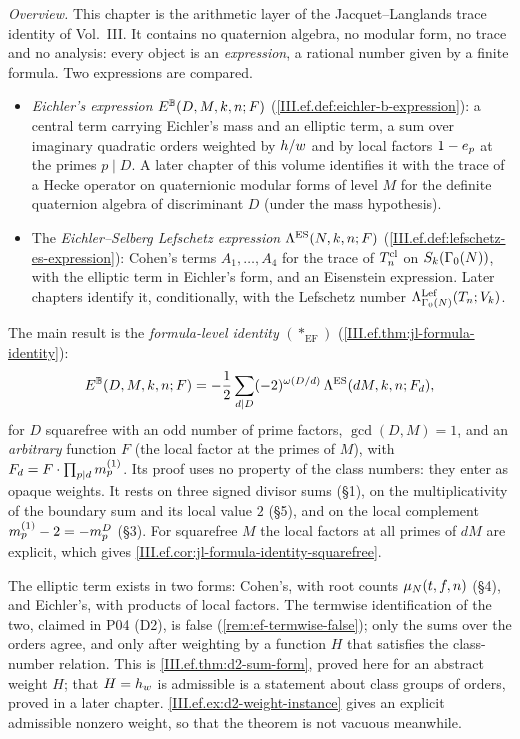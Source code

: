 \noindent\emph{Overview.} This chapter is the arithmetic layer of the Jacquet--Langlands trace identity of Vol.~III. It contains no quaternion
algebra, no modular form, no trace and no analysis: every object is an \emph{expression}, a rational number given by a finite formula. Two
expressions are compared.
\begin{itemize}
\item \emph{Eichler's expression} $E^{\mathbb{B}}(D,M,k,n;F)$ (\cref{III.ef.def:eichler-b-expression}): a central term carrying Eichler's mass and an elliptic
  term, a sum over imaginary quadratic orders weighted by $h/w$ and by local factors $1-e_p$ at the primes $p\mid D$. A later chapter of this
  volume identifies it with the trace of a Hecke operator on quaternionic modular forms of level $M$ for the definite quaternion algebra of
  discriminant $D$ (under the mass hypothesis).
\item The \emph{Eichler--Selberg Lefschetz expression} $\Lambda^{\mathrm{ES}}(N,k,n;F)$ (\cref{III.ef.def:lefschetz-es-expression}): Cohen's terms $A_1,\dots,A_4$
  for the trace of $T^{\mathrm{cl}}_n$ on $S_{k}(\Gamma_0(N))$, with the elliptic term in Eichler's form, and an Eisenstein expression. Later chapters identify it,
  conditionally, with the Lefschetz number $\Lambda^{\mathrm{Lef}}_{\Gamma_0(N)}(T_n;V_k)$.
\end{itemize}
The main result is the \emph{formula-level identity} $(*_{\mathrm{EF}})$ (\cref{III.ef.thm:jl-formula-identity}):
\[
  E^{\mathbb{B}}(D,M,k,n;F)=-\frac12\sum_{d\mid D}(-2)^{\omega(D/d)}\,\Lambda^{\mathrm{ES}}(dM,k,n;F_d),
\]
for $D$ squarefree with an odd number of prime factors, $\gcd(D,M)=1$, and an \emph{arbitrary} function $F$ (the local factor at the primes of $M$),
with $F_d=F\cdot\prod_{p\mid d}m^{(1)}_p$. Its proof uses no property of the class numbers: they enter as opaque weights. It rests on three
signed divisor sums (§1), on the multiplicativity of the boundary sum and its local value $2$ (§5), and on the local complement
$m^{(1)}_p-2=-m^{D}_p$ (§3). For squarefree $M$ the local factors at all primes of $dM$ are explicit, which gives \cref{III.ef.cor:jl-formula-identity-squarefree}.

The elliptic term exists in two forms: Cohen's, with root counts $\mu_N(t,f,n)$ (§4), and Eichler's, with products of local factors. The
termwise identification of the two, claimed in P04 (D2), is false (\cref{rem:ef-termwise-false}); only the sums over the orders agree, and only
after weighting by a function $H$ that satisfies the class-number relation. This is \cref{III.ef.thm:d2-sum-form}, proved here for an abstract
weight $H$; that $H=h_w$ is admissible is a statement about class groups of orders, proved in a later chapter. \cref{III.ef.ex:d2-weight-instance}
gives an explicit admissible nonzero weight, so that the theorem is not vacuous meanwhile.

